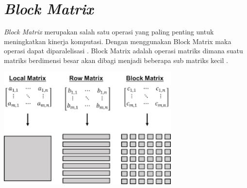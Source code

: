 \documentclass[12pt,a4paper]{report}
\begin{document}
	\section{\textit{Block Matrix}}

	\textit{Block Matrix} merupakan salah satu operasi yang paling penting untuk meningkatkan kinerja komputasi. Dengan menggunakan Block Matrix maka operasi dapat diparalelisasi \cite{Davis2004}. Block Matrix adalah operasi matriks dimana suatu matriks berdimensi besar akan dibagi menjadi beberapa sub matriks kecil \cite{Ford2003}.
	
	\begin{center}
		\includegraphics[width=9.1cm]{gambar/blockmat.png}
		\label{blockmatrix}
	\end{center}
	
\end{document}
